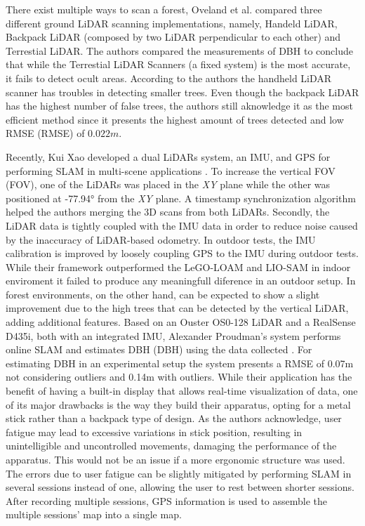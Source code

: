 There exist multiple ways to scan a forest, Oveland et al. \cite{oveland_comparing_2018} compared three different ground LiDAR scanning implementations, namely, Handeld LiDAR, Backpack LiDAR (composed by two \acs*{LiDAR} perpendicular to each other) and Terrestial LiDAR. The authors compared the measurements of \acs*{DBH} to conclude that while the Terrestial LiDAR Scanners (a fixed system) is the most accurate, it fails to detect ocult areas. According to the authors the handheld LiDAR scanner has troubles in detecting smaller trees. Even though the backpack LiDAR has the highest number of false trees, the authors still aknowledge it as the most efficient method since it presents the highest amount of trees detected and low \acl*{RMSE} (\acs*{RMSE}) of $0.022m$.

Recently, Kui Xao developed a dual \acs*{LiDAR}s system, an \acs*{IMU}, and \acs*{GPS} for performing \acs*{SLAM} in multi-scene applications \cite{xiao_high-precision_2022}. To increase the vertical \acl*{FOV} (\acs*{FOV}), one of the \acs*{LiDAR}s was placed in the \textit{XY} plane while the other was positioned at -77.94° from the \textit{XY} plane. A timestamp synchronization algorithm helped the authors merging the 3D scans from both \acs*{LiDAR}s. Secondly, the \acs*{LiDAR} data is tightly coupled with the IMU data in order to reduce noise caused by the inaccuracy of \acs*{LiDAR}-based odometry. In outdoor tests, the \acs*{IMU} calibration is improved by loosely coupling \acs*{GPS} to the \acs*{IMU} during outdoor tests. While their framework outperformed the LeGO-LOAM and LIO-SAM in indoor enviroment it failed to produce any meaningfull diference in an outdoor setup. In forest environments, on the other hand, can be expected to show a slight improvement due to the high trees that can be detected by the vertical LiDAR, adding additional features.
Based on an Ouster OS0-128 \acs{LiDAR} and a RealSense D435i, both with an integrated \acs{IMU}, Alexander Proudman's system performs online \acs{SLAM} and estimates \acl{DBH} (\acs*{DBH}) using the data collected \cite{proudman_online_2021}. For estimating \acs*{DBH} in an experimental setup the system presents a \acs*{RMSE} of 0.07m not considering outliers and 0.14m with outliers. While their application has the benefit of having a built-in display that allows real-time visualization of data, one of its major drawbacks is the way they build their apparatus, opting for a metal stick rather than a backpack type of design.  As the authors acknowledge, user fatigue may lead to excessive variations in stick position, resulting in unintelligible and uncontrolled movements, damaging the performance of the apparatus. This would not be an issue if a more ergonomic structure was used. The errors due to user fatigue can be slightly mitigated by performing \acs{SLAM} in several sessions instead of one, allowing the user to rest between shorter sessions. After recording multiple sessions, \acs*{GPS} information is used to assemble the multiple sessions' map into a single map.

